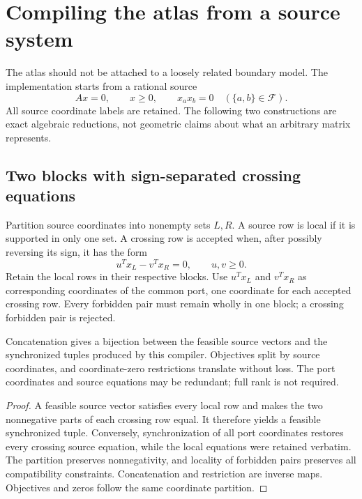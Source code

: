 \section{Compiling the atlas from a source system}
\label{sec:source}
The atlas should not be attached to a loosely related boundary model. The implementation starts from a rational source
\begin{equation}
 Ax=0,\qquad x\ge0,\qquad x_ax_b=0\quad(\{a,b\}\in\mathcal F).
 \label{eq:source}
\end{equation}
All source coordinate labels are retained. The following two constructions are exact algebraic reductions, not geometric claims about what an arbitrary matrix represents.

\subsection{Two blocks with sign-separated crossing equations}
Partition source coordinates into nonempty sets $L,R$. A source row is local if it is supported in only one set. A crossing row is accepted when, after possibly reversing its sign, it has the form
\[
 u^Tx_L-v^Tx_R=0,\qquad u,v\ge0.
\]
Retain the local rows in their respective blocks. Use $u^Tx_L$ and $v^Tx_R$ as corresponding coordinates of the common port, one coordinate for each accepted crossing row. Every forbidden pair must remain wholly in one block; a crossing forbidden pair is rejected.

\begin{proposition}
\label{prop:two-source}
Concatenation gives a bijection between the feasible source vectors and the synchronized tuples produced by this compiler. Objectives split by source coordinates, and coordinate-zero restrictions translate without loss. The port coordinates and source equations may be redundant; full rank is not required.
\end{proposition}
\begin{proof}
A feasible source vector satisfies every local row and makes the two nonnegative parts of each crossing row equal. It therefore yields a feasible synchronized tuple. Conversely, synchronization of all port coordinates restores every crossing source equation, while the local equations were retained verbatim. The partition preserves nonnegativity, and locality of forbidden pairs preserves all compatibility constraints. Concatenation and restriction are inverse maps. Objectives and zeros follow the same coordinate partition.
\end{proof}

